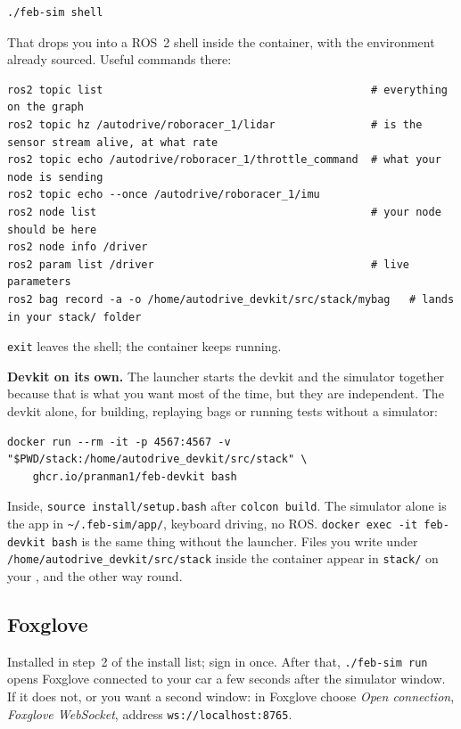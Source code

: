 \begin{lstlisting}
./feb-sim shell
\end{lstlisting}

That drops you into a ROS~2 shell inside the container, with the environment already sourced.
Useful commands there:

\begin{lstlisting}
ros2 topic list                                          # everything on the graph
ros2 topic hz /autodrive/roboracer_1/lidar               # is the sensor stream alive, at what rate
ros2 topic echo /autodrive/roboracer_1/throttle_command  # what your node is sending
ros2 topic echo --once /autodrive/roboracer_1/imu
ros2 node list                                           # your node should be here
ros2 node info /driver
ros2 param list /driver                                  # live parameters
ros2 bag record -a -o /home/autodrive_devkit/src/stack/mybag   # lands in your stack/ folder
\end{lstlisting}

\texttt{exit} leaves the shell; the container keeps running.

\textbf{Devkit on its own.} The launcher starts the devkit and the simulator together because
that is what you want most of the time, but they are independent. The devkit alone, for
building, replaying bags or running tests without a simulator:
\begin{lstlisting}
docker run --rm -it -p 4567:4567 -v "$PWD/stack:/home/autodrive_devkit/src/stack" \
    ghcr.io/pranman1/feb-devkit bash
\end{lstlisting}
Inside, \texttt{source install/setup.bash} after \texttt{colcon build}. The simulator alone is the
app in \texttt{\textasciitilde/.feb-sim/app/\OSappdir}, keyboard driving, no ROS. \texttt{docker exec -it feb-devkit
bash} is the same thing without the launcher. Files you write under
\texttt{/home/autodrive\_devkit/src/stack} inside the container appear in \texttt{stack/} on your
\OSname, and the other way round.

\subsection*{Foxglove}

Installed in step~2 of the install list; sign in once. After that, \texttt{./feb-sim run} opens
Foxglove connected to your car a few seconds after the simulator window. If it does not, or
you want a second window: in Foxglove choose \emph{Open connection}, \emph{Foxglove WebSocket},
address \texttt{ws://localhost:8765}.

